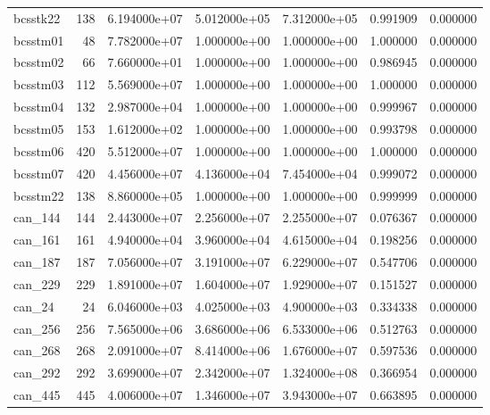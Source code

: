 \begin{tabular}{lrrrrrr}
bcsstk22                &  138 &  6.194000e+07 &  5.012000e+05 &  7.312000e+05 &  0.991909 &  0.000000 \\
bcsstm01                &   48 &  7.782000e+07 &  1.000000e+00 &  1.000000e+00 &  1.000000 &  0.000000 \\
bcsstm02                &   66 &  7.660000e+01 &  1.000000e+00 &  1.000000e+00 &  0.986945 &  0.000000 \\
bcsstm03                &  112 &  5.569000e+07 &  1.000000e+00 &  1.000000e+00 &  1.000000 &  0.000000 \\
bcsstm04                &  132 &  2.987000e+04 &  1.000000e+00 &  1.000000e+00 &  0.999967 &  0.000000 \\
bcsstm05                &  153 &  1.612000e+02 &  1.000000e+00 &  1.000000e+00 &  0.993798 &  0.000000 \\
bcsstm06                &  420 &  5.512000e+07 &  1.000000e+00 &  1.000000e+00 &  1.000000 &  0.000000 \\
bcsstm07                &  420 &  4.456000e+07 &  4.136000e+04 &  7.454000e+04 &  0.999072 &  0.000000 \\
bcsstm22                &  138 &  8.860000e+05 &  1.000000e+00 &  1.000000e+00 &  0.999999 &  0.000000 \\
can\_144                 &  144 &  2.443000e+07 &  2.256000e+07 &  2.255000e+07 &  0.076367 &  0.000000 \\
can\_161                 &  161 &  4.940000e+04 &  3.960000e+04 &  4.615000e+04 &  0.198256 &  0.000000 \\
can\_187                 &  187 &  7.056000e+07 &  3.191000e+07 &  6.229000e+07 &  0.547706 &  0.000000 \\
can\_229                 &  229 &  1.891000e+07 &  1.604000e+07 &  1.929000e+07 &  0.151527 &  0.000000 \\
can\_24                  &   24 &  6.046000e+03 &  4.025000e+03 &  4.900000e+03 &  0.334338 &  0.000000 \\
can\_256                 &  256 &  7.565000e+06 &  3.686000e+06 &  6.533000e+06 &  0.512763 &  0.000000 \\
can\_268                 &  268 &  2.091000e+07 &  8.414000e+06 &  1.676000e+07 &  0.597536 &  0.000000 \\
can\_292                 &  292 &  3.699000e+07 &  2.342000e+07 &  1.324000e+08 &  0.366954 &  0.000000 \\
can\_445                 &  445 &  4.006000e+07 &  1.346000e+07 &  3.943000e+07 &  0.663895 &  0.000000 \\

\end{tabular}
